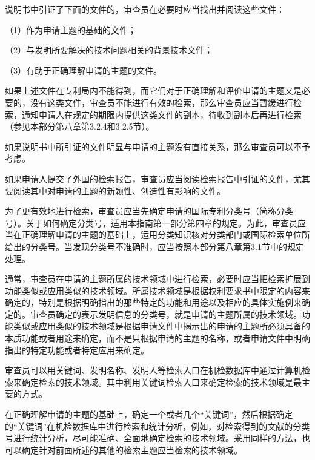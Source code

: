 说明书中引证了下面的文件的，审查员在必要时应当找出并阅读这些文件：

{\setlength{\parindent}{17.1bp}（1）作为申请主题的基础的文件；\par}

{\setlength{\parindent}{17.1bp}（2）与发明所要解决的技术问题相关的背景技术文件；\par}

{\setlength{\parindent}{17.1bp}（3）有助于正确理解申请的主题的文件。\par}

如果上述文件在专利局内不能得到，而它们对于正确理解和评价申请的主题又是必要的，没有这类文件，审查员不能进行有效的检索，那么审查员应当暂缓进行检索，通知申请人在规定的期限内提供这类文件的副本，待收到副本后再进行检索（参见本部分第八章第3.2.4和3.2.5节）。

如果说明书中所引证的文件明显与申请的主题没有直接关系，那么审查员可以不予考虑。

如果申请人提交了外国的检索报告，审查员应当阅读检索报告中引证的文件，尤其要阅读其中对申请的主题的新颖性、创造性有影响的文件。

为了更有效地进行检索，审查员应当先确定申请的国际专利分类号（简称分类号）。关于如何确定分类号，适用本指南第一部分第四章的规定。为此，审查员应当在正确理解申请的主题的基础上，运用分类知识核对分类部门或国际检索单位所给出的分类号。当发现分类号不准确时，应当按照本部分第八章第3.1节中的规定处理。

通常，审查员在申请的主题所属的技术领域中进行检索，必要时应当把检索扩展到功能类似或应用类似的技术领域。所属技术领域是根据权利要求书中限定的内容来确定的，特别是根据明确指出的那些特定的功能和用途以及相应的具体实施例来确定的。审查员确定的表示发明信息的分类号，就是申请的主题所属的技术领域。功能类似或应用类似的技术领域是根据申请文件中揭示出的申请的主题所必须具备的本质功能或者用途来确定，而不是只根据申请的主题的名称，或者申请文件中明确指出的特定功能或者特定应用来确定。

审查员可以用关键词、发明名称、发明人等检索入口在机检数据库中通过计算机检索来确定检索的技术领域。其中利用关键词检索入口来确定检索的技术领域是最主要的方式。

在正确理解申请的主题的基础上，确定一个或者几个“关键词”，然后根据确定的“关键词”在机检数据库中进行检索和统计分析，例如，对检索得到的文献的分类号进行统计分析，尽可能准确、全面地确定检索的技术领域。采用同样的方法，也可以确定针对前面所述的其他的检索主题应当检索的技术领域。

